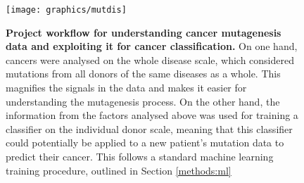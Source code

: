 \begin{figure}[h!]
    \centering
    \texttt{[image: graphics/mutdis]}
    \caption{\textbf{Project workflow for understanding cancer mutagenesis data and exploiting it for cancer classification.} On one hand, cancers were analysed on the whole disease scale, which considered mutations from all donors of the same diseases as a whole. This magnifies the signals in the data and makes it easier for understanding the mutagenesis process. On the other hand, the information from the factors analysed above was used for training a classifier on the individual donor scale, meaning that this classifier could potentially be applied to a new patient's mutation data to predict their cancer. This follows a standard machine learning training procedure, outlined in Section \ref{methods:ml}}
    \label{fig:workflow}
\end{figure}
